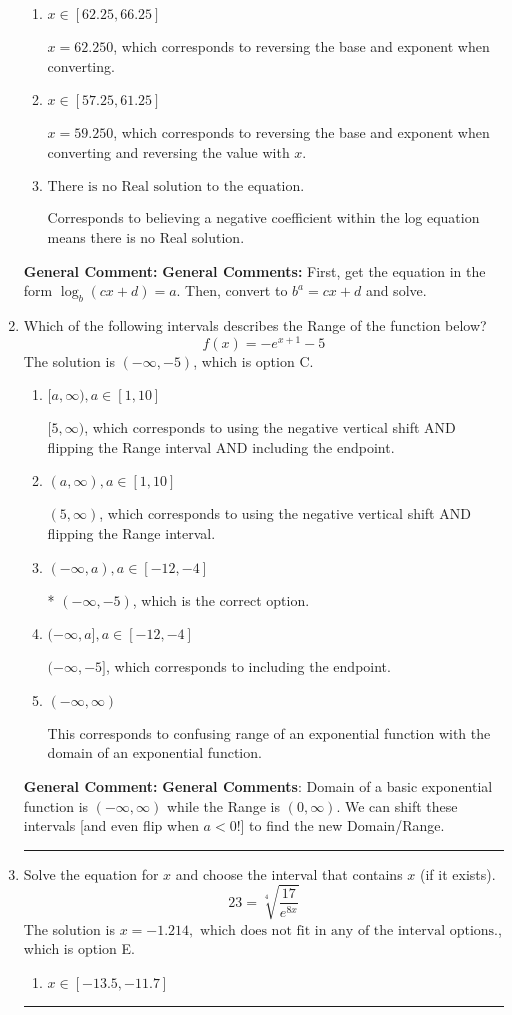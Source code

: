 \documentclass{extbook}[14pt]
\newcommand{\litem}[1]{\item #1

\rule{\textwidth}{0.4pt}}
\begin{document}
\begin{enumerate}
{\begin{enumerate}[label=\Alph*.]
* $x = 1.498$, which is the correct option.
\item \( x \in [62.25, 66.25] \)

$x = 62.250$, which corresponds to reversing the base and exponent when converting.
\item \( x \in [57.25, 61.25] \)

$x = 59.250$, which corresponds to reversing the base and exponent when converting and reversing the value with $x$.
\item \( \text{There is no Real solution to the equation.} \)

Corresponds to believing a negative coefficient within the log equation means there is no Real solution.
\end{enumerate}

\textbf{General Comment:} \textbf{General Comments:} First, get the equation in the form $\log_b{(cx+d)} = a$. Then, convert to $b^a = cx+d$ and solve.
}
\litem{
Which of the following intervals describes the Range of the function below?
\[ f(x) = -e^{x+1}-5 \]The solution is \( (-\infty, -5) \), which is option C.\begin{enumerate}[label=\Alph*.]
\item \( [a, \infty), a \in [1, 10] \)

$[5, \infty)$, which corresponds to using the negative vertical shift AND flipping the Range interval AND including the endpoint.
\item \( (a, \infty), a \in [1, 10] \)

$(5, \infty)$, which corresponds to using the negative vertical shift AND flipping the Range interval.
\item \( (-\infty, a), a \in [-12, -4] \)

* $(-\infty, -5)$, which is the correct option.
\item \( (-\infty, a], a \in [-12, -4] \)

$(-\infty, -5]$, which corresponds to including the endpoint.
\item \( (-\infty, \infty) \)

This corresponds to confusing range of an exponential function with the domain of an exponential function.
\end{enumerate}

\textbf{General Comment:} \textbf{General Comments}: Domain of a basic exponential function is $(-\infty, \infty)$ while the Range is $(0, \infty)$. We can shift these intervals [and even flip when $a<0$!] to find the new Domain/Range.
}
\litem{
 Solve the equation for $x$ and choose the interval that contains $x$ (if it exists).
\[  23 = \sqrt[4]{\frac{17}{e^{8x}}} \]The solution is \( x = -1.214, \text{ which does not fit in any of the interval options.} \), which is option E.\begin{enumerate}[label=\Alph*.]
\item \( x \in [-13.5, -11.7] \)


\end{enumerate}}
\end{enumerate}
\end{document}
